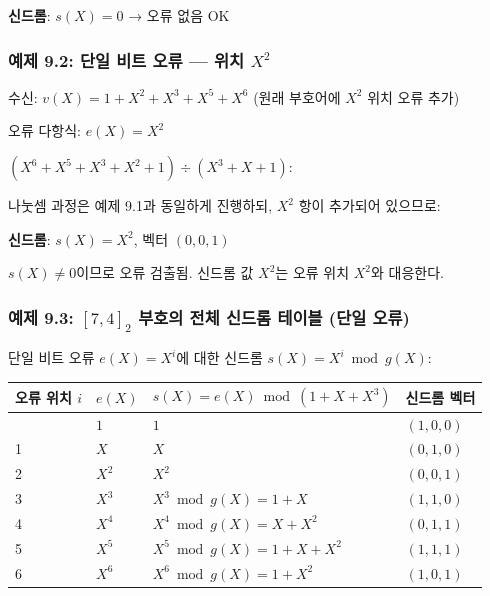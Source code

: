 \documentclass[
  oneside]{article}
\begin{document}
\textbf{신드롬}: \(s(X) = 0\) → 오류 없음 OK

\subsubsection{\texorpdfstring{예제 9.2: 단일 비트 오류 --- 위치
\(X^2\)}{예제 9.2: 단일 비트 오류 --- 위치 X\^{}2}}\label{uxc608uxc81c-9.2-uxb2e8uxc77c-uxbe44uxd2b8-uxc624uxb958-uxc704uxce58-x2}

수신: \(v(X) = 1 + X^2 + X^3 + X^5 + X^6\) (원래 부호어에 \(X^2\) 위치
오류 추가)

오류 다항식: \(e(X) = X^2\)

\((X^6 + X^5 + X^3 + X^2 + 1) \div (X^3 + X + 1)\):

나눗셈 과정은 예제 9.1과 동일하게 진행하되, \(X^2\) 항이 추가되어
있으므로:

\textbf{신드롬}: \(s(X) = X^2\), 벡터 \((0, 0, 1)\)

\(s(X) \neq 0\)이므로 오류 검출됨. 신드롬 값 \(X^2\)는 오류 위치
\(X^2\)와 대응한다.

\subsubsection{\texorpdfstring{예제 9.3: \([7, 4]_2\) 부호의 전체 신드롬
테이블 (단일
오류)}{예제 9.3: {[}7, 4{]}\_2 부호의 전체 신드롬 테이블 (단일 오류)}}\label{uxc608uxc81c-9.3-7-4_2-uxbd80uxd638uxc758-uxc804uxccb4-uxc2e0uxb4dcuxb86c-uxd14cuxc774uxbe14-uxb2e8uxc77c-uxc624uxb958}

단일 비트 오류 \(e(X) = X^i\)에 대한 신드롬 \(s(X) = X^i \bmod g(X)\):

\begin{longtable}[]{@{}llll@{}}
\toprule\noalign{}
오류 위치 \(i\) & \(e(X)\) & \(s(X) = e(X) \bmod (1+X+X^3)\) & 신드롬
벡터 \\
\midrule\noalign{}
\endhead
\bottomrule\noalign{}
\endlastfoot
0 & \(1\) & \(1\) & \((1, 0, 0)\) \\
1 & \(X\) & \(X\) & \((0, 1, 0)\) \\
2 & \(X^2\) & \(X^2\) & \((0, 0, 1)\) \\
3 & \(X^3\) & \(X^3 \bmod g(X) = 1 + X\) & \((1, 1, 0)\) \\
4 & \(X^4\) & \(X^4 \bmod g(X) = X + X^2\) & \((0, 1, 1)\) \\
5 & \(X^5\) & \(X^5 \bmod g(X) = 1 + X + X^2\) & \((1, 1, 1)\) \\
6 & \(X^6\) & \(X^6 \bmod g(X) = 1 + X^2\) & \((1, 0, 1)\) \\
\end{longtable}
\end{document}
